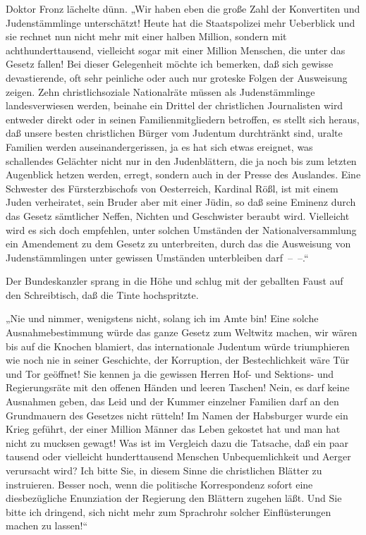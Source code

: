 Doktor Fronz lächelte dünn. „Wir haben eben die große Zahl der
Konvertiten und Judenstämmlinge unterschätzt! Heute hat die
Staatspolizei mehr Ueberblick und sie rechnet nun nicht mehr mit
einer halben Million, sondern mit achthunderttausend, vielleicht
sogar mit einer Million Menschen, die unter das Gesetz fallen! Bei
dieser Gelegenheit möchte ich bemerken, daß sich gewisse
devastierende, oft sehr peinliche oder auch nur groteske Folgen der
Ausweisung zeigen. Zehn christlichsoziale Nationalräte müssen als
Judenstämmlinge landesverwiesen werden, beinahe ein Drittel der
christlichen Journalisten wird entweder  direkt oder
in seinen Familienmitgliedern betroffen, es stellt sich heraus, daß
unsere besten christlichen Bürger vom Judentum durchtränkt sind,
uralte Familien werden auseinandergerissen, ja es hat sich etwas
ereignet, was schallendes Gelächter nicht nur in den Judenblättern,
die ja noch bis zum letzten Augenblick hetzen werden, erregt,
sondern auch in der Presse des Auslandes. Eine Schwester des
Fürsterzbischofs von Oesterreich, Kardinal Rößl, ist mit einem
Juden verheiratet, sein Bruder aber mit einer Jüdin, so daß seine
Eminenz durch das Gesetz sämtlicher Neffen, Nichten und Geschwister
beraubt wird. Vielleicht wird es sich doch empfehlen, unter solchen
Umständen der Nationalversammlung ein Amendement zu dem Gesetz zu
unterbreiten, durch das die Ausweisung von Judenstämmlingen unter
gewissen Umständen unterbleiben darf~–~–.“

Der Bundeskanzler sprang in die Höhe und schlug mit der geballten
Faust auf den Schreibtisch, daß die Tinte hochspritzte.

„Nie und nimmer, wenigstens nicht, solang ich im Amte bin! Eine
solche Ausnahmebestimmung würde das ganze Gesetz zum Weltwitz
machen, wir wären bis auf die Knochen blamiert, das internationale
Judentum würde triumphieren wie noch nie in seiner Geschichte, der
Korruption, der Bestechlichkeit wäre Tür und Tor geöffnet! Sie
kennen ja die gewissen Herren Hof- und Sektions- und Regierungsräte
mit den offenen Händen und leeren Taschen! Nein, es darf keine
Ausnahmen geben, das Leid und der Kummer einzelner Familien darf an
den Grundmauern des Gesetzes nicht rütteln! Im Namen der Habsburger
 wurde ein Krieg geführt, der einer Million Männer
das Leben gekostet hat und man hat nicht zu mucksen gewagt! Was ist
im Vergleich dazu die Tatsache, daß ein paar tausend oder
vielleicht hunderttausend Menschen Unbequemlichkeit und Aerger
verursacht wird? Ich bitte Sie, in diesem Sinne die christlichen
Blätter zu instruieren. Besser noch, wenn die politische
Korrespondenz sofort eine diesbezügliche Enunziation der Regierung
den Blättern zugehen läßt. Und Sie bitte ich dringend, sich nicht
mehr zum Sprachrohr solcher Einflüsterungen machen zu lassen!“

